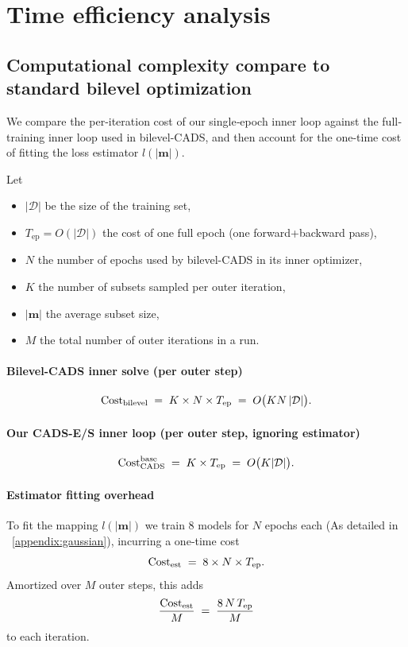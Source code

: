 \section{Time efficiency analysis}
\label{appendix:time_efficiency}

\subsection{Computational complexity compare to standard bilevel optimization}  
We compare the per‐iteration cost of our single‐epoch inner loop against the full‐training inner loop used in bilevel-CADS, and then account for the one-time cost of fitting the loss estimator $l(|\bm m|)$.

Let
\begin{itemize}
  \item $|\mathcal D|$ be the size of the training set,  
  \item $T_{\mathrm{ep}}=O(|\mathcal D|)$ the cost of one full epoch (one forward+backward pass),  
  \item $N$ the number of epochs used by bilevel-CADS in its inner optimizer,  
  \item $K$ the number of subsets sampled per outer iteration,  
  \item $|\bm m|$ the average subset size,  
  \item $M$ the total number of outer iterations in a run.
\end{itemize}

\paragraph{Bilevel-CADS inner solve (per outer step)}  
\[
\mathrm{Cost}_{\rm bilevel}
\;=\;
K \times N \times T_{\mathrm{ep}}
\;=\;
O\bigl(KN\,|\mathcal D|\bigr).
\]

\paragraph{Our CADS-E/S inner loop (per outer step, ignoring estimator)}  
\[
\mathrm{Cost}_{\rm CADS}^{\rm base}
\;=\;
K \times T_{\mathrm{ep}}
\;=\;
O\bigl(K|\mathcal D|\bigr).
\]

\paragraph{Estimator fitting overhead}  
To fit the mapping $l(|\bm m|)$ we train 8 models for $N$ epochs each (As detailed in ~\ref{appendix:gaussian}), incurring a one‐time cost  
\[
\mathrm{Cost}_{\rm est}
\;=\;
8 \times N \times T_{\mathrm{ep}}.
\]
Amortized over $M$ outer steps, this adds  
\[
\frac{\mathrm{Cost}_{\rm est}}{M}
\;=\;
\frac{8\,N\,T_{\mathrm{ep}}}{M}
\]
to each iteration.

